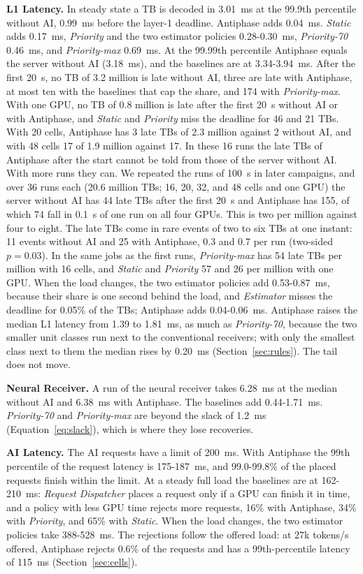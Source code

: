 \documentclass[acmsmall,screen,review,anonymous]{acmart}
\newcommand{\sys}{Antiphase\xspace}
\begin{document}
\noindent\textbf{L1 Latency.} In steady state a TB is decoded in 3.01~ms at the 99.9th percentile without AI,
0.99~ms before the layer-1 deadline. \sys adds 0.04~ms. \textit{Static} adds 0.17~ms, \textit{Priority} and
the two estimator policies 0.28-0.30~ms, \textit{Priority-70} 0.46~ms, and \textit{Priority-max} 0.69~ms. At
the 99.99th percentile \sys equals the server without AI (3.18~ms), and the baselines are at 3.34-3.94~ms.
After the first 20~s, no TB of 3.2 million is late without AI, three are late with \sys, at most ten with the
baselines that cap the share, and 174 with \textit{Priority-max}. With one GPU, no TB of 0.8 million is late
after the first 20~s without AI or with \sys, and \textit{Static} and \textit{Priority} miss the deadline for
46 and 21 TBs. With 20 cells, \sys has 3 late TBs of 2.3 million against 2 without AI, and with 48 cells 17 of
1.9 million against 17. In these 16 runs the late TBs of \sys after the start cannot be told from those of the
server without AI. With more runs they can. We repeated the runs of 100~s in later campaigns, and over 36
runs each (20.6 million TBs; 16, 20, 32, and 48 cells and one GPU) the server without AI has 44 late TBs
after the first 20~s and \sys has 155, of which 74 fall in 0.1~s of one run on all four GPUs. This is two
per million against four to eight. The late TBs come in rare events of two to six TBs at one instant: 11
events without AI and 25 with \sys, 0.3 and 0.7 per run (two-sided $p = 0.03$). In the same jobs as the
first runs, \textit{Priority-max} has 54 late TBs per million with 16 cells, and \textit{Static} and
\textit{Priority} 57 and 26 per million with one GPU. When the load changes, the two estimator policies add 0.53-0.87~ms, because their share is one
second behind the load, and \textit{Estimator} misses the deadline for 0.05\% of the TBs; \sys adds
0.04-0.06~ms. \sys raises the
median L1 latency from 1.39 to 1.81~ms, as much as \textit{Priority-70}, because the two smaller unit classes
run next to the conventional receivers; with only the smallest class next to them the median rises by
0.20~ms (Section~\ref{sec:rules}). The tail does not move.

\noindent\textbf{Neural Receiver.} A run of the neural receiver takes 6.28~ms at the median without AI
and 6.38~ms with \sys. The baselines add 0.44-1.71~ms. \textit{Priority-70} and \textit{Priority-max}
are beyond the slack of 1.2~ms (Equation~\ref{eq:slack}), which is where they lose recoveries.

\noindent\textbf{AI Latency.} The AI requests have a limit of 200~ms. With \sys the 99th percentile of the
request latency is 175-187~ms, and 99.0-99.8\% of the placed requests finish within the limit. At a steady
full load the baselines are at 162-210~ms: \textit{Request Dispatcher} places a request only if a GPU can
finish it in time, and a policy with less GPU time rejects more requests, 16\% with \sys, 34\% with
\textit{Priority}, and 65\% with \textit{Static}. When the load changes, the two estimator policies take
388-528~ms. The rejections follow the offered load: at 27k tokens/s offered, \sys rejects 0.6\% of the
requests and has a 99th-percentile latency of 115~ms (Section~\ref{sec:cells}).
\end{document}
